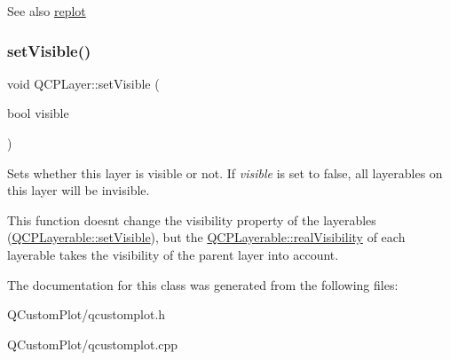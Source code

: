 \begin{DoxySeeAlso}{See also}
\mbox{\hyperlink{class_q_c_p_layer_adefd53b6db02f470151c416f42e37180}{replot}} 
\end{DoxySeeAlso}
\mbox{\label{class_q_c_p_layer_ac07671f74edf6884b51a82afb2c19516}} 
\subsubsection{\texorpdfstring{set\+Visible()}{setVisible()}}
{\footnotesize\ttfamily void Q\+C\+P\+Layer\+::set\+Visible (\begin{DoxyParamCaption}\item[{bool}]{visible }\end{DoxyParamCaption})}

Sets whether this layer is visible or not. If {\itshape visible} is set to false, all layerables on this layer will be invisible.

This function doesn\textquotesingle{}t change the visibility property of the layerables (\mbox{\hyperlink{class_q_c_p_layerable_a3bed99ddc396b48ce3ebfdc0418744f8}{Q\+C\+P\+Layerable\+::set\+Visible}}), but the \mbox{\hyperlink{class_q_c_p_layerable_ab054e88f15d485defcb95e7376f119e7}{Q\+C\+P\+Layerable\+::real\+Visibility}} of each layerable takes the visibility of the parent layer into account. 

The documentation for this class was generated from the following files\+:\begin{DoxyCompactItemize}
\item 
Q\+Custom\+Plot/qcustomplot.\+h\item 
Q\+Custom\+Plot/qcustomplot.\+cpp\end{DoxyCompactItemize}

